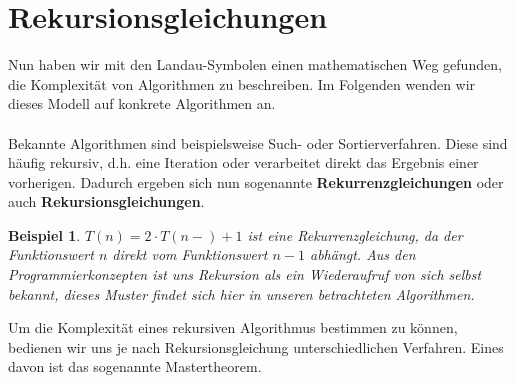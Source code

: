 \documentclass[11pt,a4paper]{scrartcl}
\newtheorem{example}{Beispiel}
\begin{document}
\section{Rekursionsgleichungen}
Nun haben wir mit den Landau-Symbolen einen mathematischen Weg gefunden, die Komplexität von Algorithmen zu beschreiben. Im Folgenden wenden wir dieses Modell auf konkrete Algorithmen an. \\\\
Bekannte Algorithmen sind beispielsweise Such- oder Sortierverfahren. Diese sind häufig rekursiv, d.h. eine Iteration oder verarbeitet direkt das Ergebnis einer vorherigen. Dadurch ergeben sich nun sogenannte \textbf{Rekurrenzgleichungen} oder auch \textbf{Rekursionsgleichungen}.
\begin{example}
$T(n) = 2 \cdot T(n-) + 1$ ist eine Rekurrenzgleichung, da der Funktionswert $n$ direkt vom Funktionswert $n-1$ abhängt. Aus den Programmierkonzepten ist uns Rekursion als ein {\glqq}Wiederaufruf von sich selbst{\grqq} bekannt, dieses Muster findet sich hier in unseren betrachteten Algorithmen.
\end{example}
Um die Komplexität eines rekursiven Algorithmus bestimmen zu können, bedienen wir uns je nach Rekursionsgleichung unterschiedlichen Verfahren. Eines davon ist das sogenannte Mastertheorem. 
\end{document}
